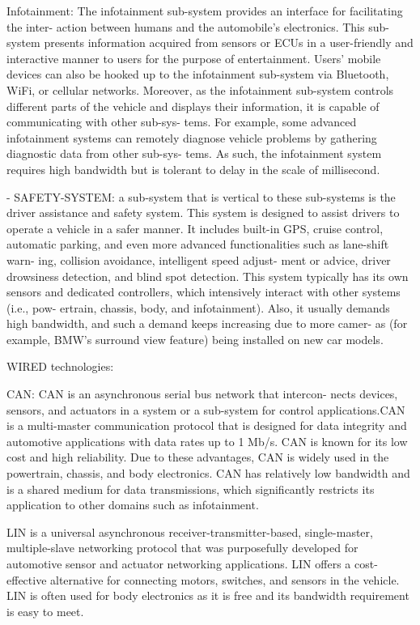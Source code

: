 Infotainment: The infotainment sub-system
provides an interface for facilitating the inter-
action between humans and the automobile’s
electronics. This sub-system presents information
acquired from sensors or ECUs in a user-friendly
and interactive manner to users for the purpose
of entertainment. Users’ mobile devices can also
be hooked up to the infotainment sub-system via
Bluetooth, WiFi, or cellular networks. Moreover,
as the infotainment sub-system controls different
parts of the vehicle and displays their information,
it is capable of communicating with other sub-sys-
tems. For example, some advanced infotainment
systems can remotely diagnose vehicle problems
by gathering diagnostic data from other sub-sys-
tems. As such, the infotainment system requires
high bandwidth but is tolerant to delay in the
scale of millisecond.

- SAFETY-SYSTEM: a sub-system that is vertical to these sub-systems
is the driver assistance and safety system. This
system is designed to assist drivers to operate a
vehicle in a safer manner. It includes built-in GPS,
cruise control, automatic parking, and even more
advanced functionalities such as lane-shift warn-
ing, collision avoidance, intelligent speed adjust-
ment or advice, driver drowsiness detection, and
blind spot detection. This system typically has its
own sensors and dedicated controllers, which
intensively interact with other systems (i.e., pow-
ertrain, chassis, body, and infotainment). Also,
it usually demands high bandwidth, and such a
demand keeps increasing due to more camer-
as (for example, BMW’s surround view feature)
being installed on new car models.

WIRED technologies:

CAN: CAN is an asynchronous serial bus network that intercon-
nects devices, sensors, and actuators in a system or a sub-system
for control applications.CAN is a multi-master communication protocol that is
designed for data integrity and automotive applications with data rates up to 1 Mb/s.
CAN is known for its low cost and high reliability. Due to these advantages, CAN is widely used
in the powertrain, chassis, and body electronics. CAN has relatively low bandwidth
and is a shared medium for data transmissions, which significantly restricts its application to other
domains such as infotainment.

LIN is a universal asynchronous receiver-transmitter-based,
single-master, multiple-slave networking protocol
that was purposefully developed for automotive
sensor and actuator networking applications. LIN
offers a cost-effective alternative for connecting
motors, switches, and sensors in the vehicle.
LIN is often used for body electronics as it is free and its bandwidth
requirement is easy to meet.

